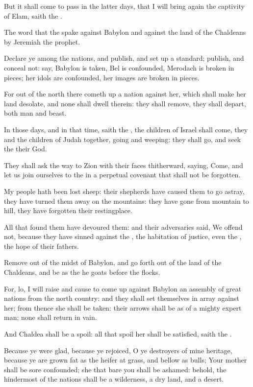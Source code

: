 \Verse But it shall come to pass in the latter days, that I will bring again the captivity of Elam, saith the \LORD.


\Chapter
\Verse The word that the \LORD spake against Babylon and against the land of the Chaldeans by Jeremiah the prophet.

\Verse Declare ye among the nations, and publish, and set up a standard; publish, and conceal not: say, Babylon is taken, Bel is confounded, Merodach is broken in pieces; her idols are confounded, her images are broken in pieces.

\Verse For out of the north there cometh up a nation against her, which shall make her land desolate, and none shall dwell therein: they shall remove, they shall depart, both man and beast.

\Verse In those days, and in that time, saith the \LORD, the children of Israel shall come, they and the children of Judah together, going and weeping: they shall go, and seek the \LORD their God.

\Verse They shall ask the way to Zion with their faces thitherward, saying, Come, and let us join ourselves to the \LORD in a perpetual covenant that shall not be forgotten.

\Verse My people hath been lost sheep: their shepherds have caused them to go astray, they have turned them away on the mountains: they have gone from mountain to hill, they have forgotten their restingplace.

\Verse All that found them have devoured them: and their adversaries said, We offend not, because they have sinned against the \LORD, the habitation of justice, even the \LORD, the hope of their fathers.

\Verse Remove out of the midst of Babylon, and go forth out of the land of the Chaldeans, and be as the he goats before the flocks.

\Verse For, lo, I will raise and cause to come up against Babylon an assembly of great nations from the north country: and they shall set themselves in array against her; from thence she shall be taken: their arrows shall be as of a mighty expert man; none shall return in vain.

\Verse And Chaldea shall be a spoil: all that spoil her shall be satisfied, saith the \LORD.

\Verse Because ye were glad, because ye rejoiced, O ye destroyers of mine heritage, because ye are grown fat as the heifer at grass, and bellow as bulls; \Verse Your mother shall be sore confounded; she that bare you shall be ashamed: behold, the hindermost of the nations shall be a wilderness, a dry land, and a desert.

